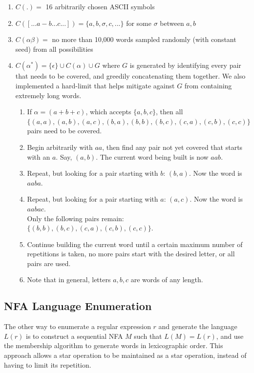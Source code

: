 \begin{enumerate}
  \item $C(.) =$ 16 arbitrarily chosen ASCII symbols
  \item $C([...a-b...c...]) = \{a, b, \sigma, c, ...\}$ for some $\sigma$ between $a,b$
  \item $C(\alpha\beta) =$ no more than 10,000 words sampled randomly (with constant seed) from all possibilities
  \item $C(\alpha^*) = \{\epsilon\} \cup C(\alpha) \cup G$ where $G$ is generated by identifying every pair that needs to be covered, and greedily concatenating them together. We also implemented a hard-limit that helps mitigate against $G$ from containing extremely long words.
    \begin{enumerate}
      \item If $\alpha = (a+b+c)$, which accepts $\{a, b, c\}$, then all \\
          $\{(a,a), (a,b), (a,c), (b,a), (b,b), (b,c), (c,a), (c,b), (c,c)\}$ pairs need to be covered.
      \item Begin arbitrarily with $aa$, then find any pair not yet covered that starts with an $a$. Say, $(a,b)$. The current word being built is now $aab$.
      \item Repeat, but looking for a pair starting with $b$: $(b, a)$. Now the word is $aaba$.
      \item Repeat, but looking for a pair starting with $a$: $(a, c)$. Now the word is $aabac$. \\
            Only the following pairs remain: $\{(b,b), (b,c), (c,a), (c,b), (c,c)\}$.
      \item Continue building the current word until a certain maximum number of repetitions is taken, no more pairs start with the desired letter, or all pairs are used.
      \item Note that in general, letters $a, b, c$ are words of any length.
    \end{enumerate}
\end{enumerate}

\subsection{NFA Language Enumeration}
\label{NFA Language Enumeration}
The other way to enumerate a regular expression $r$ and generate the language $L(r)$ is to construct a sequential NFA $M$ such that $L(M) = L(r)$, and use the  membership algorithm to generate words in lexicographic order. This approach allows a star operation to be maintained as a star operation, instead of having to limit its repetition. 

